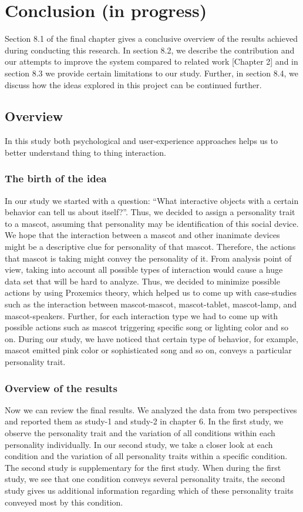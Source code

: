 \chapter{Conclusion (in progress)}
\label{ch:conclusion}
Section 8.1 of the final chapter gives a conclusive overview of the results achieved during conducting this research.
In section 8.2, we describe the contribution and our attempts to improve the system compared to related
work [Chapter 2] and in section 8.3 we provide certain limitations to our study.
Further, in section 8.4, we discuss how the ideas explored in this project can be continued further.

\section{Overview}
\label{sec:overview}
In this study both psychological and user‐experience approaches helps us to better understand thing to thing interaction.

\subsection{The birth of the idea}
\label{subsec:the-birth-of-the-idea}
In our study we started with a question: “What interactive objects with a certain behavior can tell us about itself?”.
Thus, we decided to assign a personality trait to a mascot, assuming that personality
may be identification of this social device.
We hope that the interaction between a mascot and other inanimate devices might be a
descriptive clue for personality of that mascot.
Therefore, the actions that mascot is taking might convey the personality of it.
From analysis point of view, taking into account all possible types of interaction
would cause a huge data set that will be hard to analyze.
Thus, we decided to minimize
possible actions by using Proxemics theory, which helped us to come up with case-studies such
as the interaction between mascot-mascot, mascot-tablet, mascot-lamp, and mascot-speakers.
Further, for each interaction type we had to come up with possible actions such as mascot
triggering specific song or lighting color and so on.
During our study, we have noticed that
certain type of behavior, for example, mascot emitted pink color or
sophisticated song and so on, conveys a particular personality trait.

\subsection{Overview of the results}
\label{subsec:overview-of-the-results}
Now we can review the final results.
We analyzed the data from two perspectives and reported them as study-1 and study-2 in chapter 6.
In the first study, we observe the personality trait and the variation of all
conditions within each personality individually.
In our second study, we take a closer look at each condition and the variation of
all personality traits within a specific condition.
The second study is supplementary for the first study.
When during the first study, we see that one condition conveys several personality traits,
the second study gives us additional information regarding which of these personality
traits conveyed most by this condition.

